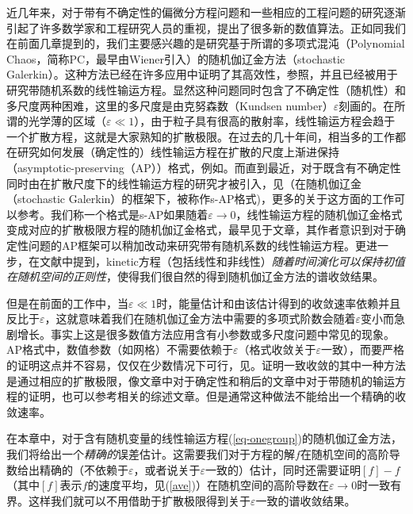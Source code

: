 近几年来，对于带有不确定性的偏微分方程问题和一些相应的工程问题的研究逐渐引起了许多数学家和工程研究人员的重视，提出了很多新的数值算法。正如同我们在前面几章提到的，我们主要感兴趣的是研究基于所谓的多项式混沌（Polynomial Chaos，简称PC，最早由Wiener引入）的随机伽辽金方法（stochastic Galerkin）。这种方法已经在许多应用中证明了其高效性，参照，并且已经被用于研究带随机系数的线性输运方程。显然这种问题同时包含了不确定性（随机性）和多尺度两种困难，这里的多尺度是由克努森数（Kundsen number）$\varepsilon$刻画的。在所谓的光学薄的区域（$\varepsilon\ll 1$），由于粒子具有很高的散射率，线性输运方程会趋于一个扩散方程，这就是大家熟知的扩散极限。在过去的几十年间，相当多的工作都在研究如何发展（确定性的）线性输运方程在扩散的尺度上渐进保持（asymptotic-preserving（AP））格式，例如。而直到最近，对于既含有不确定性同时由在扩散尺度下的线性输运方程的研究才被引入，见（在随机伽辽金（stochastic Galerkin）的框架下，被称作s-AP格式)，更多的关于这方面的工作可以参考。我们称一个格式是s-AP如果随着$\varepsilon \to 0$，线性输运方程的随机伽辽金格式变成对应的扩散极限方程的随机伽辽金格式，最早见于文章，其作者意识到对于确定性问题的AP框架可以稍加改动来研究带有随机系数的线性输运方程。更进一步，在文献中提到，kinetic方程（包括线性和非线性）{\it 随着时间演化可以保持初值在随机空间的正则性}，使得我们很自然的得到随机伽辽金方法的谱收敛结果。

但是在前面的工作中，当$\varepsilon\ll 1$时，能量估计和由该估计得到的收敛速率依赖并且反比于$\varepsilon$，这就意味着我们在随机伽辽金方法中需要的多项式阶数会随着$\varepsilon$变小而急剧增长。事实上这是很多数值方法应用含有小参数或多尺度问题中常见的现象。AP格式中，数值参数（如网格）不需要依赖于$\varepsilon$（格式收敛关于$\varepsilon$一致），而要严格的证明这点并不容易，仅仅在少数情况下可行，见。证明一致收敛的其中一种方法是通过相应的扩散极限，像文章中对于确定性和稍后的文章中对于带随机的输运方程的证明，也可以参考相关的综述文章。但是通常这种做法不能给出一个精确的收敛速率。

在本章中，对于含有随机变量的线性输运方程(\ref{eq-onegroup})的随机伽辽金方法，我们将给出一个{\it 精确的}误差估计。这需要我们对于方程的解$f$在随机空间的高阶导数给出精确的（不依赖于$\varepsilon$，或者说关于$\varepsilon$一致的）估计，同时还需要证明$[f]-f$（其中$[f]$表示$f$的速度平均，见(\ref{ave})）在随机空间的高阶导数在$\varepsilon \to 0$时一致有界。这样我们就可以不用借助于扩散极限得到关于$\varepsilon$一致的谱收敛结果。

